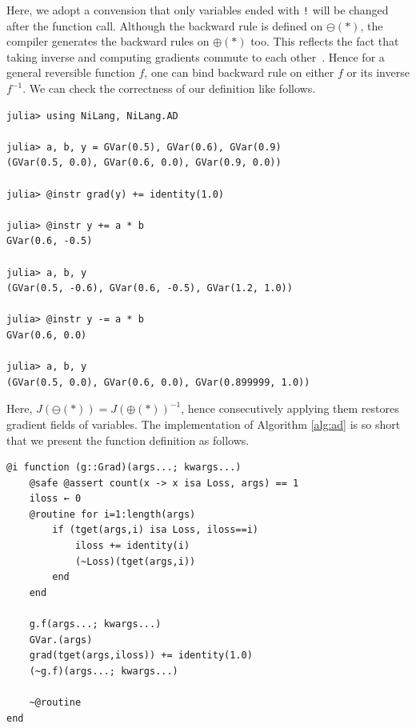 \documentclass[aps,twocolumn,longbibliography,english,superscriptaddress]{revtex4-1}
\newcommand{\<}{\langle}
\renewcommand{\>}{\rangle}
\theoremstyle{definition}\newtheorem{definition}{\textit{Definition}}
\begin{document}
Here, we adopt a convension that only variables ended with \texttt{!} will be changed after the function call.
Although the backward rule is defined on $\ominus(*)$, the compiler generates the backward rules on $\oplus(*)$ too.
This reflects the fact that taking inverse and computing gradients commute to each other~\cite{Mcinerney2015}. Hence for a general reversible function $f$, one can bind backward rule on either $f$ or its inverse $f^{-1}$.
We can check the correctness of our definition like follows.

\begin{minipage}{.44\textwidth}
\begin{lstlisting}[mathescape=true]
julia> using NiLang, NiLang.AD

julia> a, b, y = GVar(0.5), GVar(0.6), GVar(0.9)
(GVar(0.5, 0.0), GVar(0.6, 0.0), GVar(0.9, 0.0))

julia> @instr grad(y) += identity(1.0)

julia> @instr y += a * b
GVar(0.6, -0.5)

julia> a, b, y
(GVar(0.5, -0.6), GVar(0.6, -0.5), GVar(1.2, 1.0))

julia> @instr y -= a * b
GVar(0.6, 0.0)

julia> a, b, y
(GVar(0.5, 0.0), GVar(0.6, 0.0), GVar(0.899999, 1.0))
\end{lstlisting}
\end{minipage}

Here, $J(\ominus(*)) = J(\oplus(*))^{-1}$, hence consecutively applying them restores gradient fields of variables.
The implementation of Algorithm \ref{alg:ad} is so short that we present the function definition as follows.

\begin{minipage}{.44\textwidth}
\begin{lstlisting}
@i function (g::Grad)(args...; kwargs...)
    @safe @assert count(x -> x isa Loss, args) == 1
    iloss ← 0
    @routine for i=1:length(args)
        if (tget(args,i) isa Loss, iloss==i)
            iloss += identity(i)
            (~Loss)(tget(args,i))
        end
    end

    g.f(args...; kwargs...)
    GVar.(args)
    grad(tget(args,iloss)) += identity(1.0)
    (~g.f)(args...; kwargs...)

    ~@routine
end
\end{lstlisting}\label{lst:ad}
\end{minipage}
\end{document}

